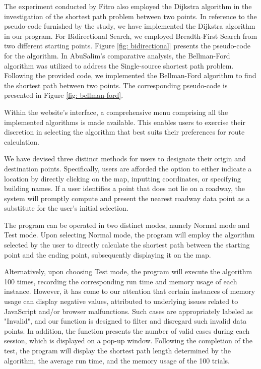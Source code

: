 \documentclass[12pt]{article}
\begin{document}
The experiment conducted by Fitro \cite{Fitro_2018} also employed the Dijkstra algorithm in the investigation of the shortest path problem between two points. In reference to the pseudo-code furnished by the study, we have implemented the Dijkstra algorithm in our program. For Bidirectional Search, we employed Breadth-First Search from two different starting points. Figure \ref{fig: bidirectional} presents the pseudo-code for the algorithm. In AbuSalim's comparative analysis\cite{AbuSalim_Ibrahim_Zainuri_Saringat_Jamel_Abdul_Wahab_2020}, the Bellman-Ford algorithm was utilized to address the Single-source shortest path problem. Following the provided code, we implemented the Bellman-Ford algorithm to find the shortest path between two points. The corresponding pseudo-code is presented in Figure \ref{fig: bellman-ford}.

Within the website's interface, a comprehensive menu comprising all the implemented algorithms is made available. This enables users to exercise their discretion in selecting the algorithm that best suits their preferences for route calculation.

We have devised three distinct methods for users to designate their origin and destination points. Specifically, users are afforded the option to either indicate a location by directly clicking on the map, inputting coordinates, or specifying building names. If a user identifies a point that does not lie on a roadway, the system will promptly compute and present the nearest roadway data point as a substitute for the user's initial selection.

The program can be operated in two distinct modes, namely Normal mode and Test mode. Upon selecting Normal mode, the program will employ the algorithm selected by the user to directly calculate the shortest path between the starting point and the ending point, subsequently displaying it on the map.

Alternatively, upon choosing Test mode, the program will execute the algorithm 100 times, recording the corresponding run time and memory usage of each instance. However, it has come to our attention that certain instances of memory usage can display negative values, attributed to underlying issues related to JavaScript and/or browser malfunctions. Such cases are appropriately labeled as "Invalid", and our function is designed to filter and disregard such invalid data points. In addition, the function presents the number of valid cases during each session, which is displayed on a pop-up window. Following the completion of the test, the program will display the shortest path length determined by the algorithm, the average run time, and the memory usage of the 100 trials.
\end{document}
